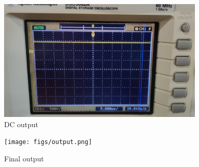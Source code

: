 \documentclass{article}
\begin{document}
\begin{figure}
    \centering
    \includegraphics[width=\columnwidth]{figs/dc.png}
    \caption{DC output}
    \label{fig:my_label}
\end{figure}
\begin{figure}
    \centering
    \texttt{[image: figs/output.png]}
    \caption{Final output}
    \label{fig:my_label}
\end{figure}
\end{document}
